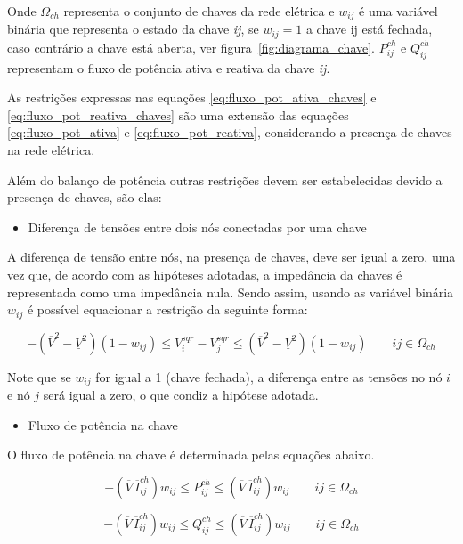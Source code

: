 Onde $\Omega_{ch}$ representa o conjunto de chaves da rede elétrica e $w_{ij}$ é uma variável binária que representa o estado da chave \textit{ij}, se $w_{ij} = 1$ a chave ij está fechada, caso contrário a chave está aberta, ver figura~\ref{fig:diagrama_chave}. $P_{ij}^{ch}$ e $Q_{ij}^{ch}$ representam o fluxo de potência ativa e reativa da chave \textit{ij}.
    
As restrições expressas nas equações \ref{eq:fluxo_pot_ativa_chaves} e \ref{eq:fluxo_pot_reativa_chaves} são uma extensão das equações \ref{eq:fluxo_pot_ativa} e \ref{eq:fluxo_pot_reativa}, considerando a presença de chaves na rede elétrica.
    
Além do balanço de potência outras restrições devem ser estabelecidas devido a presença de chaves, são elas:
    
\begin{itemize}
    \item Diferença de tensões entre dois nós conectadas por uma chave
\end{itemize}

    
A diferença de tensão entre nós, na presença de chaves, deve ser igual a zero, uma vez que, de acordo com as hipóteses adotadas, a impedância da chaves é representada como uma impedância nula.
Sendo assim, usando as variável binária $w_{ij}$ é possível equacionar a restrição da seguinte forma:
    
\begin{equation}
    -(\overline{V}^{2} - \underline{V}^{2})(1-w_{ij}) \leq V_{i}^{sqr} - V_{j}^{sqr} \leq (\overline{V}^{2} - \underline{V}^{2})(1-w_{ij})\qquad ij\in\Omega_{ch}        
\end{equation}
    
Note que se $w_{ij}$ for igual a 1 (chave fechada), a diferença entre as tensões no nó $i$ e nó $j$ será igual a zero, o que condiz a hipótese adotada.
\begin{itemize}
   \item Fluxo de potência na chave
\end{itemize} 
    
O fluxo de potência na chave é determinada pelas equações abaixo.
    
\begin{equation}
    -(\overline{V}\,\overline{I}_{ij}^{ch})w_{ij} \leq P_{ij}^{ch} \leq (\overline{V}\,\overline{I}_{ij}^{ch})w_{ij}\qquad ij\in\Omega_{ch}   
\end{equation}
    
    
\begin{equation}
    -(\overline{V}\,\overline{I}_{ij}^{ch})w_{ij} \leq Q_{ij}^{ch} \leq (\overline{V}\,\overline{I}_{ij}^{ch})w_{ij}\qquad ij\in\Omega_{ch}   
\end{equation}
    
